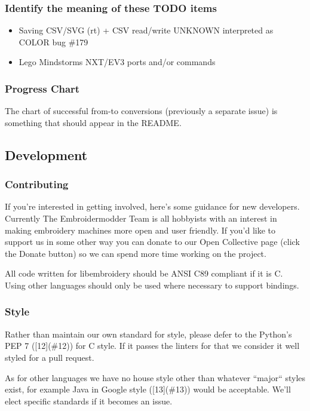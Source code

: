 \documentclass[a4paper, 11pt]{report}
\begin{document}
\subsubsection{Identify the meaning of these TODO items}

\begin{itemize}
\item Saving CSV/SVG (rt) + CSV read/write UNKNOWN interpreted as COLOR bug \#179
\item Lego Mindstorms NXT/EV3 ports and/or commands
\end{itemize}

\subsubsection{Progress Chart}

The chart of successful from-to conversions (previously a separate issue)
is something that should appear in the README.

\subsection{Development}

\subsubsection{Contributing}

If you're interested in getting involved, here's some guidance
for new developers. Currently The Embroidermodder Team is all
hobbyists with an interest in making embroidery machines more
open and user friendly. If you'd like to support us in some other way
you can donate to our Open Collective page (click the Donate button) so
we can spend more time working on the project.

All code written for libembroidery should be ANSI C89 compliant
if it is C. Using other languages should only be used where
necessary to support bindings.

\subsubsection{ Style}

Rather than maintain our own standard for style, please defer to
the Python's PEP 7 ([12](\#12)) for C style.
If it passes the linters for that we consider it well styled
for a pull request.

As for other languages we have no house style other than whatever
``major`` styles exist, for example Java in
Google style ([13](\#13))
would be acceptable. We'll elect specific standards if it becomes
an issue.
\end{document}
